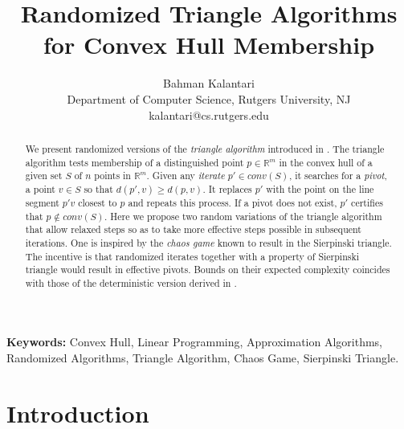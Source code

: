 \documentclass{article}
\theoremstyle{definition}
\begin{document}
\title{Randomized Triangle Algorithms for Convex Hull Membership}
\author{ Bahman Kalantari\\
Department of Computer Science, Rutgers University, NJ\\
kalantari@cs.rutgers.edu
}
\date{}
\maketitle


\begin{abstract}
We present randomized versions of the {\it triangle algorithm} introduced in \cite{kal14}. The triangle algorithm tests membership of a distinguished point $p \in \mathbb{R} ^m$  in the convex hull of a given set $S$ of $n$ points in $\mathbb{R}^m$.  Given any {\it iterate} $p' \in conv(S)$, it searches for a {\it pivot}, a point $v \in S$ so that $d(p',v) \geq d(p,v)$.  It replaces $p'$ with the point on the line segment $p'v$ closest to $p$ and repeats this process. If a pivot does not exist, $p'$ certifies that
$p \not \in conv(S)$.  Here we propose two  random variations of the triangle algorithm that allow relaxed steps so as to take more effective steps possible in subsequent iterations. One is inspired by the {\it chaos game} known to result in the Sierpinski triangle.  The incentive is that randomized iterates together with a property of Sierpinski triangle would result in effective pivots. Bounds on their expected complexity coincides with those of the deterministic version derived in \cite{kal14}.
\end{abstract}

{\bf Keywords:}  Convex Hull, Linear Programming,  Approximation Algorithms, Randomized Algorithms, Triangle Algorithm, Chaos Game, Sierpinski Triangle.

\section{Introduction}
\end{document}
